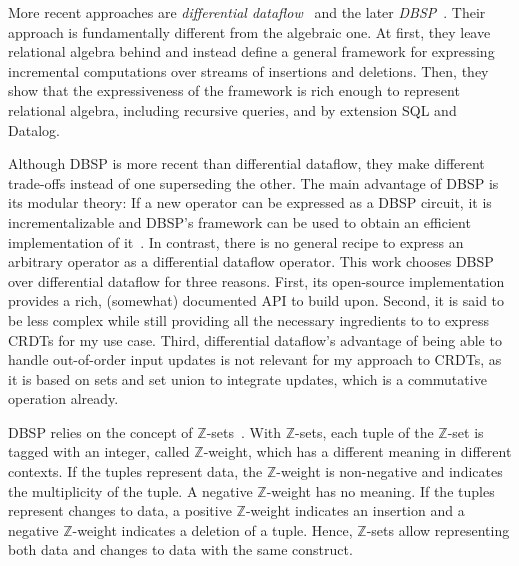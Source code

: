 More recent approaches are \emph{differential dataflow}~\cite{mcsherry2013differential}
and the later \emph{DBSP}~\cite{budiu2024dbsp, budiu2025dbsp}.
Their approach is fundamentally different from the algebraic one.
At first, they leave relational algebra behind and instead define a general
framework for expressing incremental computations over streams of insertions
and deletions.
Then, they show that the expressiveness of the framework is rich enough to
represent relational algebra, including recursive queries, and by extension
SQL and Datalog.

Although DBSP is more recent than differential dataflow,
they make different trade-offs instead of one superseding the other.
The main advantage of DBSP is its modular theory:
If a new operator can be expressed as a DBSP circuit, it is incrementalizable
and DBSP's framework can be used to obtain an efficient implementation
of it~\cite{budiu2025dbsp}.
In contrast, there is no general recipe to express an arbitrary operator
as a differential dataflow operator.
This work chooses DBSP over differential dataflow for three reasons.
First, its open-source implementation~\cite{felderarepo} provides a rich,
(somewhat) documented \acs{API}\footnotemark{} to build upon.
Second, it is said to be less complex while still providing all the necessary
ingredients to to express \acp{CRDT} for my use case.
Third, differential dataflow's advantage of being able to handle out-of-order
input updates is not relevant for my approach to \acp{CRDT},
as it is based on sets and set union to integrate updates,
which is a commutative operation already.


\newcommand{\zset}{\(\mathbb{Z}\)-set}
\newcommand{\zsets}{\(\mathbb{Z}\)-sets}
\newcommand{\zweight}{\(\mathbb{Z}\)-weight}

DBSP relies on the concept of \zsets{}~\cite{green2007provenance}\footnotemark{}.
With \zsets{}, each tuple of the \zset{} is tagged with an integer,
called \zweight{}, which has a different meaning in different contexts.
If the tuples represent data, the \zweight{} is non-negative and indicates
the multiplicity of the tuple.
A negative \zweight{} has no meaning.
If the tuples represent changes to data, a positive \zweight{} indicates
an insertion and a negative \zweight{} indicates a deletion of a tuple.
Hence, \zsets{} allow representing both data and changes to data with the
same construct.

